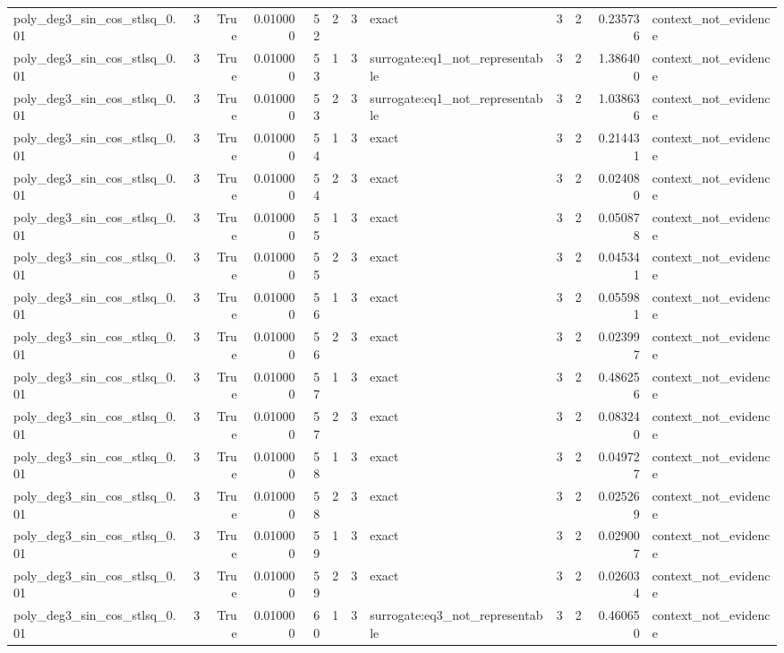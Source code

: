 \begin{tabular}{lrrrrrrlrrrl}
poly\_deg3\_sin\_cos\_stlsq\_0.01 & 3 & True & 0.010000 & 52 & 2 & 3 & exact & 3 & 2 & 0.235736 & context\_not\_evidence \\
poly\_deg3\_sin\_cos\_stlsq\_0.01 & 3 & True & 0.010000 & 53 & 1 & 3 & surrogate:eq1\_not\_representable & 3 & 2 & 1.386400 & context\_not\_evidence \\
poly\_deg3\_sin\_cos\_stlsq\_0.01 & 3 & True & 0.010000 & 53 & 2 & 3 & surrogate:eq1\_not\_representable & 3 & 2 & 1.038636 & context\_not\_evidence \\
poly\_deg3\_sin\_cos\_stlsq\_0.01 & 3 & True & 0.010000 & 54 & 1 & 3 & exact & 3 & 2 & 0.214431 & context\_not\_evidence \\
poly\_deg3\_sin\_cos\_stlsq\_0.01 & 3 & True & 0.010000 & 54 & 2 & 3 & exact & 3 & 2 & 0.024080 & context\_not\_evidence \\
poly\_deg3\_sin\_cos\_stlsq\_0.01 & 3 & True & 0.010000 & 55 & 1 & 3 & exact & 3 & 2 & 0.050878 & context\_not\_evidence \\
poly\_deg3\_sin\_cos\_stlsq\_0.01 & 3 & True & 0.010000 & 55 & 2 & 3 & exact & 3 & 2 & 0.045341 & context\_not\_evidence \\
poly\_deg3\_sin\_cos\_stlsq\_0.01 & 3 & True & 0.010000 & 56 & 1 & 3 & exact & 3 & 2 & 0.055981 & context\_not\_evidence \\
poly\_deg3\_sin\_cos\_stlsq\_0.01 & 3 & True & 0.010000 & 56 & 2 & 3 & exact & 3 & 2 & 0.023997 & context\_not\_evidence \\
poly\_deg3\_sin\_cos\_stlsq\_0.01 & 3 & True & 0.010000 & 57 & 1 & 3 & exact & 3 & 2 & 0.486256 & context\_not\_evidence \\
poly\_deg3\_sin\_cos\_stlsq\_0.01 & 3 & True & 0.010000 & 57 & 2 & 3 & exact & 3 & 2 & 0.083240 & context\_not\_evidence \\
poly\_deg3\_sin\_cos\_stlsq\_0.01 & 3 & True & 0.010000 & 58 & 1 & 3 & exact & 3 & 2 & 0.049727 & context\_not\_evidence \\
poly\_deg3\_sin\_cos\_stlsq\_0.01 & 3 & True & 0.010000 & 58 & 2 & 3 & exact & 3 & 2 & 0.025269 & context\_not\_evidence \\
poly\_deg3\_sin\_cos\_stlsq\_0.01 & 3 & True & 0.010000 & 59 & 1 & 3 & exact & 3 & 2 & 0.029007 & context\_not\_evidence \\
poly\_deg3\_sin\_cos\_stlsq\_0.01 & 3 & True & 0.010000 & 59 & 2 & 3 & exact & 3 & 2 & 0.026034 & context\_not\_evidence \\
poly\_deg3\_sin\_cos\_stlsq\_0.01 & 3 & True & 0.010000 & 60 & 1 & 3 & surrogate:eq3\_not\_representable & 3 & 2 & 0.460650 & context\_not\_evidence \\

\end{tabular}
